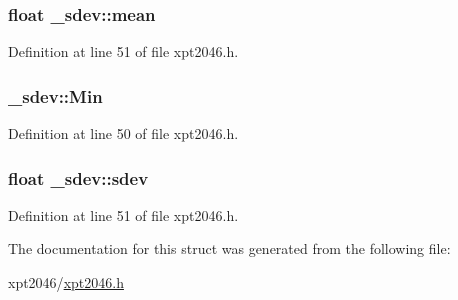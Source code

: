 \subsubsection[{\texorpdfstring{mean}{mean}}]{\setlength{\rightskip}{0pt plus 5cm}float \+\_\+sdev\+::mean}\hypertarget{struct__sdev_a2bd0cf80fd334fabaac9100a2538bcb5}{}\label{struct__sdev_a2bd0cf80fd334fabaac9100a2538bcb5}


Definition at line 51 of file xpt2046.\+h.

\subsubsection[{\texorpdfstring{Min}{Min}}]{ \+\_\+sdev\+::\+Min}\hypertarget{struct__sdev_ad496630f4d9975834148dcff8e2475c6}{}\label{struct__sdev_ad496630f4d9975834148dcff8e2475c6}


Definition at line 50 of file xpt2046.\+h.

\subsubsection[{\texorpdfstring{sdev}{sdev}}]{\setlength{\rightskip}{0pt plus 5cm}float \+\_\+sdev\+::sdev}\hypertarget{struct__sdev_a053a14f9e4bd729ce23aafdb1e69e48a}{}\label{struct__sdev_a053a14f9e4bd729ce23aafdb1e69e48a}


Definition at line 51 of file xpt2046.\+h.



The documentation for this struct was generated from the following file\+:\begin{DoxyCompactItemize}
\item 
xpt2046/\hyperlink{xpt2046_8h}{xpt2046.\+h}\end{DoxyCompactItemize}
